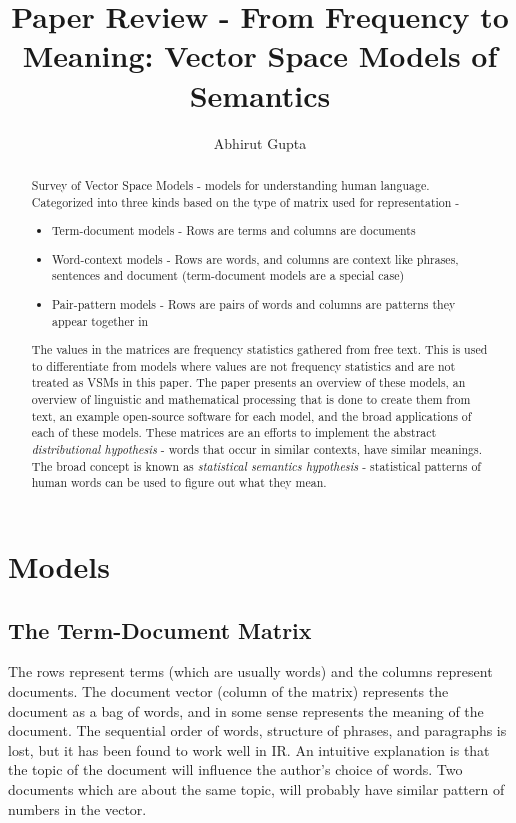 \documentclass{article}
\begin{document}
\title{Paper Review - From Frequency to Meaning: Vector Space Models of Semantics}
\author{Abhirut Gupta}

\maketitle

\begin{abstract}
Survey of Vector Space Models - models for understanding human language. Categorized into three kinds based on the type of matrix used for representation -

\begin{itemize}
\item Term-document models - Rows are terms and columns are documents
\item Word-context models - Rows are words, and columns are context like phrases, sentences and document (term-document models are a special case)
\item Pair-pattern models - Rows are pairs of words and columns are patterns they appear together in
\end{itemize}

The values in the matrices are frequency statistics gathered from free text. This is used to differentiate from models where values are not frequency statistics and are not treated as VSMs in this paper. The paper presents an overview of these models, an overview of linguistic and mathematical processing that is done to create them from text, an example open-source software for each model, and the broad applications of each of these models. These matrices are an efforts to implement the abstract \textit{distributional hypothesis} - words that occur in similar contexts, have similar meanings. The broad concept is known as \textit{statistical semantics hypothesis} - statistical patterns of human words can be used to figure out what they mean.
\end{abstract}
\section{Models}

\subsection{The Term-Document Matrix}
The rows represent terms (which are usually words) and the columns represent documents. The document vector (column of the matrix) represents the document as a bag of words, and in some sense represents the meaning of the document. The sequential order of words, structure of phrases, and paragraphs is lost, but it has been found to work well in IR. An intuitive explanation is that the topic of the document will influence the author's choice of words. Two documents which are about the same topic, will probably have similar pattern of numbers in the vector.
\end{document}
